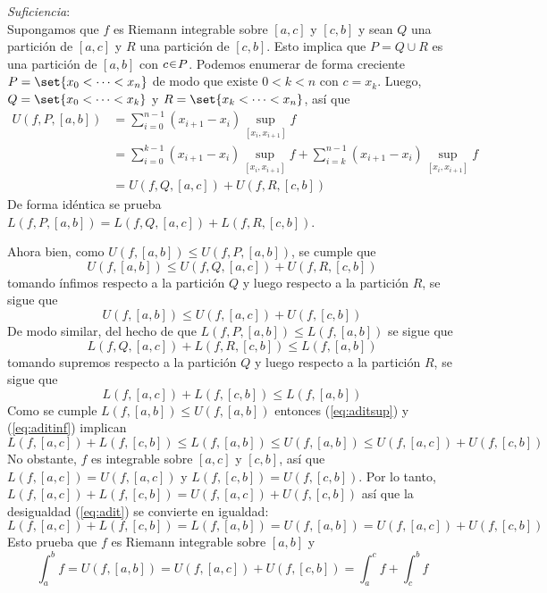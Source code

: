 \begin{sol}
\emph{Suficiencia}:\\
Supongamos que $f$ es Riemann integrable sobre $[a,c]$ y $[c,b]$ y sean $Q$ una partición de $[a,c]$ y $R$ una partición de $[c,b]$. Esto implica que $P = Q \cup R$ es una partición de $[a,b]$ con $c\en P$. Podemos enumerar de forma creciente $P = \set{x_0<\cdots< x_n}$ de modo que existe $0 < k < n$ con $c = x_k$. Luego, $Q = \set{x_0 < \cdots < x_k}$ y $R = \set{x_k < \cdots < x_n}$, así que
\begin{align*}
U(f,P,[a,b])%
&= \sum^{n-1}_{i=0}(x_{i+1}-x_i)\sup_{[x_i,x_{i+1}]} f \\
&= \sum^{k-1}_{i=0}(x_{i+1}-x_i)\sup_{[x_i,x_{i+1}]} f + \sum^{n-1}_{i=k}(x_{i+1}-x_i)\sup_{[x_i,x_{i+1}]} f \\
&= U(f,Q,[a,c]) + U(f,R,[c,b])
\end{align*}
De forma idéntica se prueba $L(f,P,[a,b]) = L(f,Q,[a,c]) + L(f,R,[c,b])$.\par
Ahora bien, como $U(f,[a,b]) \leq U(f,P,[a,b])$, se cumple que 
\[
U(f,[a,b]) \leq U(f,Q,[a,c]) + U(f,R,[c,b])
\]
tomando ínfimos respecto a la partición $Q$ y luego respecto a la partición $R$, se sigue que 
\begin{equation}\label{eq:aditsup}
U(f,[a,b]) \leq  U(f,[a,c]) + U(f,[c,b])   
\end{equation}
De modo similar, del hecho de que $L(f,P,[a,b]) \leq L(f,[a,b])$ se sigue que 
\[
L(f,Q,[a,c]) + L(f,R,[c,b]) \leq L(f,[a,b])
\]
tomando supremos respecto a la partición $Q$ y luego respecto a la partición $R$, se sigue que 
\begin{equation}\label{eq:aditinf}
L(f,[a,c]) + L(f,[c,b]) \leq L(f,[a,b])
\end{equation}
Como se cumple $L(f,[a,b]) \leq U(f,[a,b])$ entonces (\ref{eq:aditsup}) y (\ref{eq:aditinf}) implican
\begin{equation}\label{eq:adit}
L(f,[a,c]) + L(f,[c,b]) \leq L(f,[a,b]) \leq U(f,[a,b]) \leq  U(f,[a,c]) + U(f,[c,b])
\end{equation}
No obstante, $f$ es integrable sobre $[a,c]$ y $[c,b]$, así que $L(f,[a,c]) = U(f,[a,c])$ y $L(f,[c,b]) = U(f,[c,b])$. Por lo tanto, $L(f,[a,c]) + L(f,[c,b]) = U(f,[a,c]) + U(f,[c,b])$ así que la desigualdad (\ref{eq:adit}) se convierte en igualdad:
\[
L(f,[a,c]) + L(f,[c,b]) = L(f,[a,b]) = U(f,[a,b]) =  U(f,[a,c]) + U(f,[c,b])
\]
Esto prueba que $f$ es Riemann integrable sobre $[a,b]$ y 
\[
\int^b_a f = U(f,[a,b]) = U(f,[a,c]) + U(f,[c,b]) = {\int^c_af} + {\int^b_c f}
\]
\end{sol}

